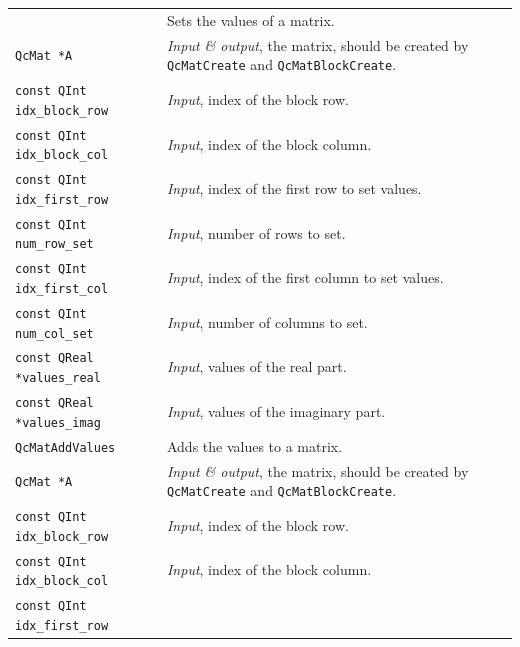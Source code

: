 \documentclass[a4paper,11pt,twoside,openright]{book}
\begin{document}
\begin{center}
\begin{longtable}{l|p{}}
      & Sets the values of a matrix.\\
    \hspace*{2ex}\verb|QcMat *A| %
      & \textsl{Input \& output}, the matrix, should be created by \verb|QcMatCreate|
        and \verb|QcMatBlockCreate|.\\
    \hspace*{2ex}\verb|const QInt idx_block_row| %
      & \textsl{Input}, index of the block row.\\
    \hspace*{2ex}\verb|const QInt idx_block_col| %
      & \textsl{Input}, index of the block column.\\
    \hspace*{2ex}\verb|const QInt idx_first_row| %
      & \textsl{Input}, index of the first row to set values.\\
    \hspace*{2ex}\verb|const QInt num_row_set| %
      & \textsl{Input}, number of rows to set.\\
    \hspace*{2ex}\verb|const QInt idx_first_col| %
      & \textsl{Input}, index of the first column to set values.\\
    \hspace*{2ex}\verb|const QInt num_col_set| %
      & \textsl{Input}, number of columns to set.\\
    \hspace*{2ex}\verb|const QReal *values_real| %
      & \textsl{Input}, values of the real part.\\
    \hspace*{2ex}\verb|const QReal *values_imag| %
      & \textsl{Input}, values of the imaginary part.\\
    \hline
%
    \verb|QcMatAddValues|\index{\texttt{QcMatAddValues}} %
      & Adds the values to a matrix.\\
    \hspace*{2ex}\verb|QcMat *A| %
      & \textsl{Input \& output}, the matrix, should be created by \verb|QcMatCreate|
        and \verb|QcMatBlockCreate|.\\
    \hspace*{2ex}\verb|const QInt idx_block_row| %
      & \textsl{Input}, index of the block row.\\
    \hspace*{2ex}\verb|const QInt idx_block_col| %
      & \textsl{Input}, index of the block column.\\
    \hspace*{2ex}\verb|const QInt idx_first_row| %

\end{longtable}
\end{center}
\end{document}
